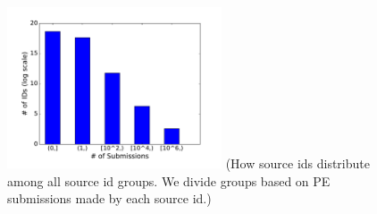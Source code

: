 \begin{figure}[t!]
\begin{center}
\includegraphics[width=2.5in]{figure/IDDistribution}
{\footnotesize{(How source ids distribute among all source id groups. 
We divide groups based on PE submissions made by each source id.)}}
\end{center}
\end{figure}